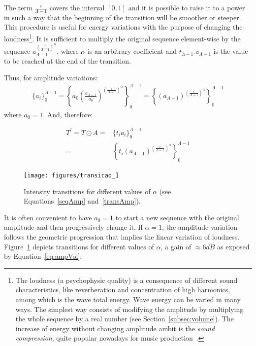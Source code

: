 The term $\frac{i}{\Lambda-1}$ covers the interval $[0,1]$ and it is possible to raise it to a power in such a way that the beginning of the transition will be smoother or steeper. This procedure is useful for energy variations with the purpose of changing the loudness\footnote{The
loudness (a psychophysic quality) is a consequence of different sound characteristics, like reverberation and concentration of high harmonics, among which is the wave total energy. Wave energy can be varied in many ways. The simplest way consists of modifying the amplitude by multiplying the whole sequence by a real number (see Section~\ref{subsec:volume}). The increase of energy without changing amplitude ambit is the \emph{sound compression}, quite popular nowadays for music production~\cite{guillaume}.}. It is sufficient to multiply the original sequence element-wise by the sequence $a_{\Lambda-1}^{\left( \frac{i}{\Lambda-1} \right )^\alpha}$, where $\alpha$ is an arbitrary coefficient and $t_{\Lambda-1}.a_{\Lambda-1}$ is the value to be reached at the end of the transition.

Thus, for amplitude variations:
\begin{equation}\label{seqAmp}
\begin{split}
 \{a_i\}_0^{\Lambda-1}= \left \{ a_0 \left ( \frac{a_{\Lambda-1}}{a_0} \right )^{\left ( \frac{i}{\Lambda-1} \right )^\alpha} \right \}_0^{\Lambda-1}= \left \{ \left ( {a_{\Lambda-1}} \right )^{\left ( \frac{i}{\Lambda-1} \right )^\alpha} \right \}_0^{\Lambda-1}
\end{split}
\end{equation}
where $a_0=1$. And, therefore:

\begin{equation}\label{transAmp}
\begin{split}
 T^{'}=T \odot A = & \{t_i a_i\}_0^{\Lambda-1} \\ = & \left \{ t_i (a_{\Lambda-1} )^{\left ( \frac{i}{\Lambda-1} \right )^\alpha} \right \}_0^{\Lambda-1}
\end{split}
\end{equation}

\begin{figure}[h!]
     \centering
         \texttt{[image: figures/transicao\_]}
     \caption{Intensity transitions for different values of $\alpha$ (see Equations~\ref{seqAmp} and~\ref{transAmp}).}
         \label{fig:transicao}
\end{figure}

It is often convenient to have $a_0=1$ to start a new sequence with the original amplitude and then progressively change it.
If $\alpha=1$, the amplitude variation follows the geometric progression that implies the linear variation of loudness. Figure~\ref{fig:transicao} depicts transitions for different values of $\alpha$, a gain of $\approx 6dB$ as exposed by Equation~\ref{eq:ampVol}.

